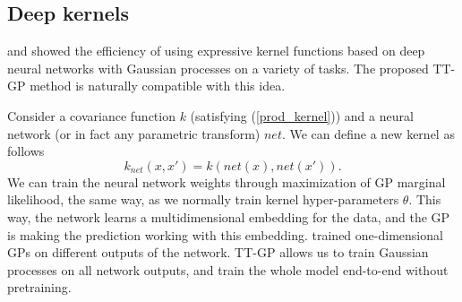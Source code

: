 \subsection{Deep kernels}
  
  \citet{wilson2016deep} and \citet{wilson2016deep} showed the efficiency
  of using expressive kernel functions based on deep neural networks with
  Gaussian processes on a variety of tasks. The proposed TT-GP method is
  naturally compatible with this idea. 
  
  Consider a covariance function $k$ (satisfying (\ref{prod_kernel})) and 
  a neural network (or in fact any parametric transform) $net$. We can define a 
  new kernel as follows
  \[
    k_{net}(x, x') = k(net(x), net(x')).
  \]
  We can train the neural network weights through maximization of GP marginal
  likelihood, the same way, as we normally train kernel hyper-parameters $\theta$.
  This way, the network learns a multidimensional embedding for the data, and
  the GP is making the prediction working with this embedding.
  \citet{wilson2016stochastic} trained one-dimensional GPs on different outputs
  of the network. TT-GP allows us to train Gaussian processes on all network 
  outputs, and train the whole model end-to-end without pretraining.
